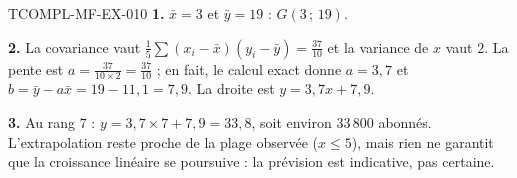 \begin{corrige}{TCOMPL-MF-EX-010}
\textbf{1.} $\bar x=3$ et $\bar y=19$ : $G(3\,;\,19)$.

\textbf{2.} La covariance vaut
$\tfrac15\sum(x_i-\bar x)(y_i-\bar y)=\tfrac{37}{10}$ et la variance de $x$
vaut $2$. La pente est $a=\tfrac{37}{10\times2}=\tfrac{37}{10}$ ; en fait, le
calcul exact donne $a=3{,}7$ et $b=\bar y-a\bar x=19-11{,}1=7{,}9$. La droite
est $y=3{,}7x+7{,}9$.

\textbf{3.} Au rang $7$ : $y=3{,}7\times7+7{,}9=33{,}8$, soit environ
$33\,800$ abonnés. L'extrapolation reste proche de la plage observée
($x\leq5$), mais rien ne garantit que la croissance linéaire se poursuive :
la prévision est indicative, pas certaine.
\end{corrige}
